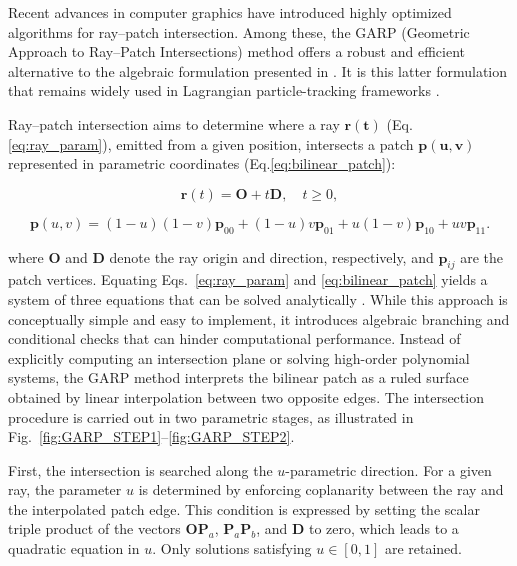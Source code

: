 Recent advances in computer graphics have introduced highly optimized algorithms for ray--patch intersection. 
Among these, the GARP (Geometric Approach to Ray--Patch Intersections) method \cite{Reshetov_2019} offers a robust and efficient alternative to the algebraic formulation presented in \cite{Ramsey_2004}. It is this latter formulation that remains widely used in Lagrangian particle-tracking frameworks \cite{Haselbacher_2007, Kopper_2023}.

Ray–patch intersection aims to determine where a ray $\boldsymbol{r(t)}$ (Eq.\ref{eq:ray_param}), emitted from a given position, intersects a patch $\boldsymbol{p(u,v)}$ represented in parametric coordinates (Eq.\ref{eq:bilinear_patch}):

\begin{equation}
\boldsymbol{r}(t) = \boldsymbol{O} + t\boldsymbol{D}, \quad t \ge 0,
\label{eq:ray_param}
\end{equation}

\begin{equation}
\boldsymbol{p}(u,v) = (1-u)(1-v)\boldsymbol{p}_{00} + (1-u)v\boldsymbol{p}_{01}
+ u(1-v)\boldsymbol{p}_{10} + uv\boldsymbol{p}_{11}.
\label{eq:bilinear_patch}
\end{equation}

\noindent where $\boldsymbol{O}$ and $\boldsymbol{D}$ denote the ray origin and direction, respectively, and $\boldsymbol{p}_{ij}$ are the patch vertices. 
Equating Eqs.~\ref{eq:ray_param} and \ref{eq:bilinear_patch} yields a system of three equations that can be solved analytically \cite{Ramsey_2004}.  While this approach is conceptually simple and easy to implement, it introduces algebraic branching and conditional checks that can hinder computational performance. Instead of explicitly computing an intersection plane or solving high-order polynomial systems, the GARP method interprets the bilinear patch as a ruled surface obtained by linear interpolation between two opposite edges. The intersection procedure is carried out in two parametric stages, as illustrated in Fig.~\ref{fig:GARP_STEP1}--\ref{fig:GARP_STEP2}.

First, the intersection is searched along the $u$-parametric direction. For a given ray, the parameter $u$ is determined by enforcing coplanarity between the ray and the interpolated patch edge. This condition is expressed by setting the scalar triple product of the vectors $\boldsymbol{O}\boldsymbol{P}_a$, $\boldsymbol{P}_a\boldsymbol{P}_b$, and $\boldsymbol{D}$ to zero, which leads to a quadratic equation in $u$. Only solutions satisfying $u \in [0,1]$ are retained.

